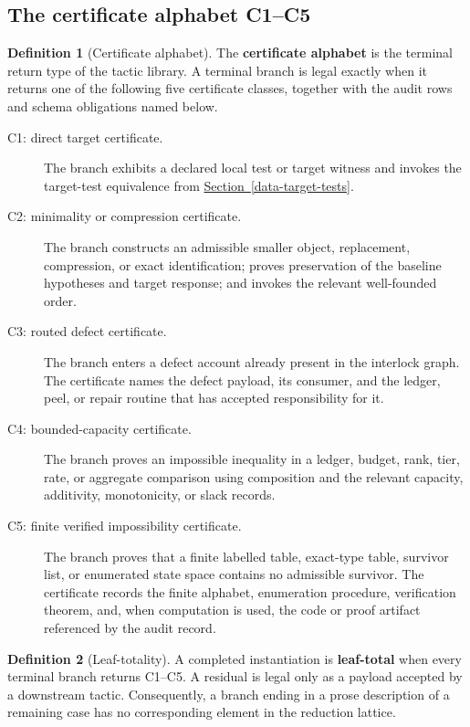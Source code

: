 \documentclass[
  11pt,
]{article}
\theoremstyle{definition}
\newtheorem{definition}{Definition}[section]
\newcommand{\secref}[1]{\hyperref[#1]{Section~\ref*{#1}}}
\begin{document}
\subsection{The certificate alphabet C1--C5}\label{data-certificate-alphabet}
\begin{definition}[Certificate alphabet]\label{def:certificate-alphabet}
The \textbf{certificate alphabet} is the terminal return type of the
tactic library.  A terminal branch is legal exactly when it returns one
of the following five certificate classes, together with the audit rows
and schema obligations named below.

\begin{description}
\item[C1: direct target certificate.]
The branch exhibits a declared local test or target witness and invokes
the target-test equivalence from \secref{data-target-tests}.

\item[C2: minimality or compression certificate.]
The branch constructs an admissible smaller object, replacement,
compression, or exact identification; proves preservation of the
baseline hypotheses and target response; and invokes the relevant
well-founded order.

\item[C3: routed defect certificate.]
The branch enters a defect account already present in the interlock
graph.  The certificate names the defect payload, its consumer, and the
ledger, peel, or repair routine that has accepted responsibility for it.

\item[C4: bounded-capacity certificate.]
The branch proves an impossible inequality in a ledger, budget, rank,
tier, rate, or aggregate comparison using composition and the relevant
capacity, additivity, monotonicity, or slack records.

\item[C5: finite verified impossibility certificate.]
The branch proves that a finite labelled table, exact-type table,
survivor list, or enumerated state space contains no admissible
survivor.  The certificate records the finite alphabet, enumeration
procedure, verification theorem, and, when computation is used, the code
or proof artifact referenced by the audit record.
\end{description}
\end{definition}

\begin{definition}[Leaf-totality]\label{def:leaf-totality}
A completed instantiation is \textbf{leaf-total} when every terminal
branch returns C1--C5.  A residual is legal only as a payload accepted by
a downstream tactic.  Consequently, a branch ending in a prose
description of a remaining case has no corresponding element in the
reduction lattice.
\end{definition}
\end{document}
